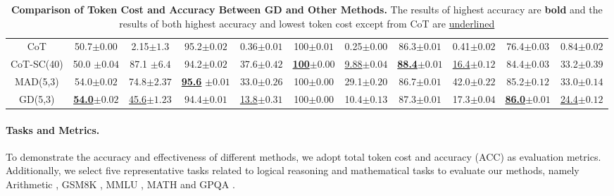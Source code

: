 \begin{table}[t]
{\begin{tabular}{ccccccccccc}
\rowcolor{Gray}
\multicolumn{11}{c}{\texttt{DeepSeek-V3}} 
\\
\midrule
CoT                      & 50.7\scriptsize{$\pm 0.00$} & 2.15\scriptsize{$\pm 1.3$}           & 95.2\scriptsize{$\pm 0.02$} & 0.36\scriptsize{$\pm 0.01$}         & 100\scriptsize{$\pm 0.01$} & 0.25\scriptsize{$\pm 0.00$}                & 86.3\scriptsize{$\pm 0.01$}  & 0.41\scriptsize{$\pm 0.02$}         & 76.4\scriptsize{$\pm 0.03$} & 0.84\scriptsize{$\pm 0.02$}           \\
CoT-SC(40)               & 50.0 \scriptsize{$\pm 0.04$} & 87.1 \scriptsize{$\pm 6.4$}          & 94.2\scriptsize{$\pm 0.02$}  & 37.6\scriptsize{$\pm 0.42$}         & \underline{\textbf{100}}\scriptsize{$\pm 0.00$}     & \underline{9.88}\scriptsize{$\pm 0.04$}                & \underline{\textbf{88.4}}\scriptsize{$\pm 0.01$} & \underline{16.4}\scriptsize{$\pm 0.12$}         & 84.4\scriptsize{$\pm 0.03$} & 33.2\scriptsize{$\pm 0.39$}           \\
MAD(5,3)                 & 54.0\scriptsize{$\pm 0.02$} & 74.8\scriptsize{$\pm 2.37$}          & \underline{\textbf{95.6}} \scriptsize{$\pm 0.01$} & 33.0\scriptsize{$\pm 0.26$}        & 100\scriptsize{$\pm 0.00$} & 29.1\scriptsize{$\pm 0.20$}                & 86.7\scriptsize{$\pm 0.01$} & 42.0\scriptsize{$\pm 0.22$}         & 85.2\scriptsize{$\pm 0.12$} & 33.0\scriptsize{$\pm 0.14$}           \\ 
GD(5,3)                  & \underline{\textbf{54.0}}\scriptsize{$\pm 0.02$} & \underline{45.6}\scriptsize{$\pm 1.23$}           & 94.4\scriptsize{$\pm 0.01$} & \underline{13.8}\scriptsize{$\pm 0.31$}         & 100\scriptsize{$\pm 0.00$} & 10.4\scriptsize{$\pm 0.13$}                & 87.3\scriptsize{$\pm 0.01$} & 17.3\scriptsize{$\pm 0.04$}         & \underline{\textbf{86.0}}\scriptsize{$\pm 0.01$} & \underline{24.4}\scriptsize{$\pm 0.12$} \\
\bottomrule
\end{tabular}
}
\caption{\textbf{Comparison of Token Cost and Accuracy Between GD and Other Methods.} The results of highest accuracy are \textbf{bold} and the results of both highest accuracy and lowest token cost except from CoT are \underline{underlined}}
\label{comp_with_single}
\end{table}

\paragraph{Tasks and Metrics.} To demonstrate the accuracy and effectiveness of different methods, we adopt total token cost and accuracy (ACC) as evaluation metrics. Additionally, we select five representative tasks related to logical reasoning and mathematical tasks to evaluate our methods, namely Arithmetic \cite{brown2020language}, GSM8K \cite{cobbe2021training}, MMLU \cite{hendrycks2020measuring}, MATH \cite{hendrycks2021measuring} and GPQA \cite{rein2023gpqa}.

